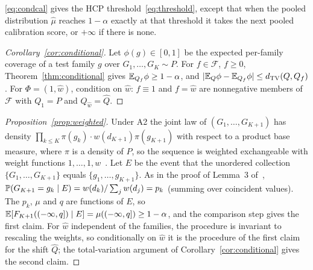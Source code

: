\eqref{eq:condcal} gives the HCP threshold~\eqref{eq:threshold}, except that when the pooled distribution $\hat\mu$ reaches $1-\alpha$ exactly at that threshold it takes the next pooled calibration score, or $+\infty$ if there is none.

\begin{proof}[Corollary~\ref{cor:conditional}]
Let $\phi(g)\in[0,1]$ be the expected per-family coverage of a test family $g$ over $G_1,\dots,G_K\sim P$. For $f\in\mathcal{F}$, $f\ge0$, Theorem~\ref{thm:conditional} gives $\E_{Q_f}\phi\ge1-\alpha$, and $|\E_Q\phi-\E_{Q_f}\phi|\le\dtv(Q,Q_f)$. For $\Phi=(1,\hat w)$, condition on $\hat w$: $f\equiv1$ and $f=\hat w$ are nonnegative members of $\mathcal{F}$ with $Q_1=P$ and $Q_{\hat w}=\hat Q$.
\end{proof}

\begin{proof}[Proposition~\ref{prop:weighted}]
Under A2 the joint law of $(G_1,\dots,G_{K+1})$ has density $\prod_{k\le K}\pi(g_k)\cdot w(d_{K+1})\pi(g_{K+1})$ with respect to a product base measure, where $\pi$ is a density of $P$, so the sequence is weighted exchangeable with weight functions $1,\dots,1,w$~\cite[Def.~1, Lemma~2]{tibshirani2019conformal}. Let $E$ be the event that the unordered collection $\{G_1,\dots,G_{K+1}\}$ equals $\{g_1,\dots,g_{K+1}\}$. As in the proof of Lemma~3 of~\cite{tibshirani2019conformal}, $\P(G_{K+1}=g_k\mid E)=w(d_k)/\sum_jw(d_j)=p_k$ (summing over coincident values). The $p_k$, $\mu$ and $q$ are functions of $E$, so $\E[F_{K+1}((-\infty,q])\mid E]=\mu((-\infty,q])\ge1-\alpha$, and the comparison step gives the first claim. For $\hat w$ independent of the families, the procedure is invariant to rescaling the weights, so conditionally on $\hat w$ it is the procedure of the first claim for the shift $\hat Q$; the total-variation argument of Corollary~\ref{cor:conditional} gives the second claim.
\end{proof}

